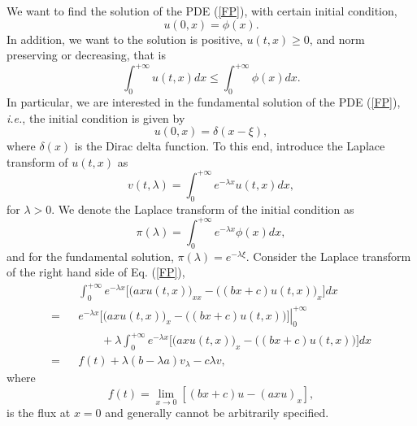 \documentclass[12pt]{article}
\begin{document}
  We want to find the solution of the PDE (\ref{FP}), with certain initial condition,
  \begin{equation}
    u(0,x) = \phi(x).
    \label{init0}
  \end{equation}
  In addition, we want to the solution is positive, $u(t,x)\ge 0$, and norm preserving or decreasing, that is
  \begin{equation}
    \int_0^{+\infty}u(t,x)dx \le \int_0^{+\infty}\phi(x)dx.
  \end{equation}
  In particular, we are
  interested in the fundamental solution of the PDE (\ref{FP}), {\it i.e.}, the initial condition is given
  by
  \begin{equation}
    u(0,x)=\delta(x-\xi),
    \label{init}
  \end{equation}
  where $\delta(x)$ is the Dirac delta function. To this end, introduce the Laplace transform of $u(t,x)$ as
  \begin{equation}
    v(t,\lambda)=\int_0^{+\infty}e^{-\lambda x}u(t,x)dx,
  \end{equation}
  for $\lambda > 0$. We denote the Laplace transform of the initial condition as
  \begin{equation}
    \pi(\lambda) = \int_0^{+\infty}e^{-\lambda x}\phi(x)dx,
  \end{equation}
  and for the fundamental solution, $\pi(\lambda) = e^{-\lambda \xi}$.
  Consider the Laplace transform of the right hand side of Eq. (\ref{FP}),
  \begin{eqnarray}
      && \int_0^{+\infty} e^{-\lambda x}\bigg[\big(axu(t,x)\big)_{xx}-\big((bx+c)u(t,x)\big)_x\bigg]dx \nonumber\\
    = && \left. e^{-\lambda x}\bigg[\big(axu(t,x)\big)_{x}-\big((bx+c)u(t,x)\big)\bigg]\right|_0^{+\infty}\nonumber\\
      && \quad\quad +\lambda \int_0^{+\infty} e^{-\lambda x}\bigg[\big(axu(t,x)\big)_{x}-\big((bx+c)u(t,x)\big)\bigg]dx \nonumber\\
    = && f(t) + \lambda(b-\lambda a)v_{\lambda} - c\lambda v,
  \end{eqnarray}
  where
  \begin{equation}
    f(t) = \lim_{x\rightarrow 0}\left[(bx+c)u-(axu)_x\right],
  \end{equation}
  is the flux at $x=0$ and generally cannot be arbitrarily specified.
\end{document}
